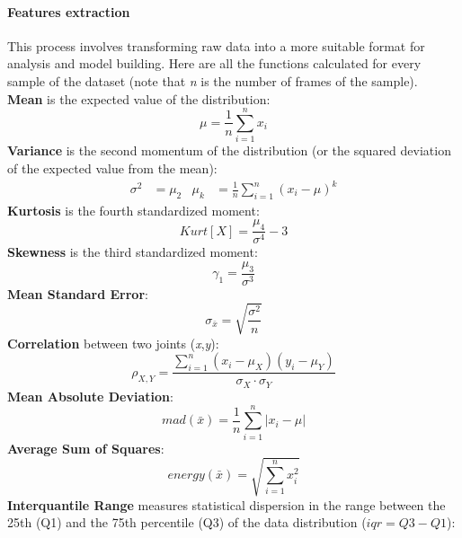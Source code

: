 \paragraph{Features extraction}
This process involves transforming raw data into a more suitable format for analysis and model building.
Here are all the functions calculated for every sample of the dataset (note that \textit{n} is the number of frames of the sample). \\

\textbf{Mean} is the expected value of the distribution:
        \begin{equation}
            \mu = \frac{1}{n} \sum_{i=1}^{n} x_i
        \end{equation}
\textbf{Variance} is the second momentum of the distribution (or the squared deviation of the expected value from the mean):
        \begin{align}
          \sigma^2 &= \mu_2 &
          \mu_k &= \frac{1}{n} \sum_{i=1}^{n} (x_i - \mu)^k 
        \end{align}
\textbf{Kurtosis} is the fourth standardized moment:
        \begin{equation}
            Kurt[X] = \frac{\mu_4}{\sigma^4} - 3
        \end{equation}
\textbf{Skewness} is the third standardized moment:
        \begin{equation}
            \gamma_1 = \frac{\mu_3}{\sigma^3}
        \end{equation}
\textbf{Mean Standard Error}:
        \begin{equation}
            \sigma_{\bar{x}} = \sqrt{\frac{\sigma^2}{n}}
        \end{equation}
\textbf{Correlation} between two joints (\textit{x},\textit{y}):
        \begin{equation}
            \rho_{X,Y} = \frac{\sum_{i=1}^n (x_i - \mu_{X})(y_i - \mu_{Y})}{\sigma_{X}\cdot\sigma_{Y}}
        \end{equation}
\textbf{Mean Absolute Deviation}:
        \begin{equation}
            mad(\bar{x}) = \frac{1}{n} \sum_{i=1}^{n} |x_i - \mu|
        \end{equation}
\textbf{Average Sum of Squares}:
        \begin{equation}
            energy(\bar{x}) = \sqrt{\sum_{i=1}^{n} x_i^2}
        \end{equation}
\textbf{Interquantile Range} measures statistical dispersion in the range between the 25th (Q1) and the 75th percentile (Q3) of the data distribution ($ iqr = Q3 - Q1 $):
